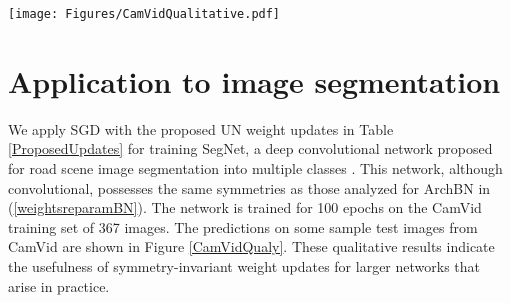 \documentclass{article} %
\newcommand{\changeBM}[1]{#1} %
\begin{document}
%



\begin{figure*}[t]
\centering
\texttt{[image: Figures/CamVidQualitative.pdf]}
\caption{\footnotesize{SGD with the proposed UN weight updates, shown in Table \ref{ProposedUpdates}, for training SegNet \cite{SegNetarXiv}. The quality of the predictions as compared to the ground truth indicates a successful training of SegNet.}}
\label{CamVidQualy}
\end{figure*}

\section{Application to image segmentation}
\label{DeepConvNets}
We \changeBM{apply SGD with the proposed UN weight updates in Table \ref{ProposedUpdates} for} training SegNet, a deep convolutional network proposed for road scene image segmentation into multiple classes \cite{SegNetarXiv}. This network, although convolutional, possesses the same symmetries as those analyzed for ArchBN in (\ref{weightsreparamBN}). The network \changeBM{is} trained for 100 epochs on the CamVid \cite{GabeDataset} training set of 367 images. The predictions on some sample test images from  CamVid are shown in Figure \ref{CamVidQualy}. These qualitative results indicate the usefulness of \changeBM{symmetry-invariant} weight updates for larger networks that arise in practice. 
\end{document}
